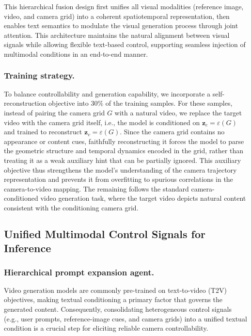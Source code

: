 \documentclass[letterpaper]{article} %
\begin{document}
This hierarchical fusion design first unifies all visual modalities (reference image, video, and camera grid) into a coherent spatiotemporal representation, then enables text semantics to modulate the visual generation process through joint attention. This architecture maintains the natural alignment between visual signals while allowing flexible text-based control, supporting seamless injection of multimodal conditions in an end-to-end manner.


\subsubsection{Training strategy.}
To balance controllability and generation capability, we incorporate a
self-reconstruction objective into $30\%$ of the training samples.
For these samples, instead of pairing the camera grid $G$ with a natural
video, we replace the target video with the camera grid itself, i.e., the
model is conditioned on $\mathbf{z}_c = \varepsilon(G)$ and trained to
reconstruct $\mathbf{z}_v = \varepsilon(G)$.
Since the camera grid contains no appearance or content cues, faithfully 
reconstructing it forces the model to parse the geometric structure and
temporal dynamics encoded in the grid, rather than treating it as a weak
auxiliary hint that can be partially ignored.
This auxiliary objective thus strengthens the model's understanding of the
camera trajectory representation and prevents it from overfitting to
spurious correlations in the camera-to-video mapping.
The remaining follows the standard camera-conditioned
video generation task, where the target video depicts natural content
consistent with the conditioning camera grid.


\subsection{Unified Multimodal Control Signals for Inference}
\subsubsection{Hierarchical prompt expansion agent.}


Video generation models are commonly pre-trained on text-to-video (T2V) objectives, making textual conditioning a primary factor that governs the generated content. Consequently, consolidating heterogeneous control signals (e.g., user prompts, reference-image cues, and camera grids) into a unified textual condition is a crucial step for eliciting reliable camera controllability.
\end{document}
